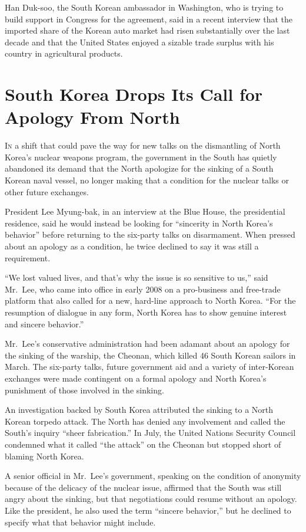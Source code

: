 ﻿\documentclass[12pt]{article}
\begin{document}
Han Duk-soo, the South Korean ambassador in Washington, who is trying to build support in Congress
for the agreement, said in a recent interview that the imported share of the Korean auto market had
risen substantially over the last decade and that the United States enjoyed a sizable trade surplus
with his country in agricultural products.

\section{South Korea Drops Its Call for Apology From North}

\lettrine{I}{n} a shift that could pave the way for new talks on the
dismantling of North Korea's nuclear weapons program, the government in the South has quietly
abandoned its demand that the North apologize for the sinking of a South Korean naval vessel, no
longer making that a condition for the nuclear talks or other future exchanges.

President Lee Myung-bak, in an interview at the Blue House, the presidential residence, said he
would instead be looking for ``sincerity in North Korea's behavior'' before returning to the
six-party talks on disarmament. When pressed about an apology as a condition, he twice declined to
say it was still a requirement.

``We lost valued lives, and that's why the issue is so sensitive to us,'' said Mr.~Lee, who came
into office in early 2008 on a pro-business and free-trade platform that also called for a new,
hard-line approach to North Korea. ``For the resumption of dialogue in any form, North Korea has to
show genuine interest and sincere behavior.''

Mr.~Lee's conservative administration had been adamant about an apology for the sinking of the
warship, the Cheonan, which killed 46 South Korean sailors in March. The six-party talks, future
government aid and a variety of inter-Korean exchanges were made contingent on a formal apology and
North Korea's punishment of those involved in the sinking.

An investigation backed by South Korea attributed the sinking to a North Korean torpedo attack. The
North has denied any involvement and called the South's inquiry ``sheer fabrication.'' In July, the
United Nations Security Council condemned what it called ``the attack'' on the Cheonan but stopped
short of blaming North Korea.

A senior official in Mr.~Lee's government, speaking on the condition of anonymity because of the
delicacy of the nuclear issue, affirmed that the South was still angry about the sinking, but that
negotiations could resume without an apology. Like the president, he also used the term ``sincere
behavior,'' but he declined to specify what that behavior might include.
\end{document}
